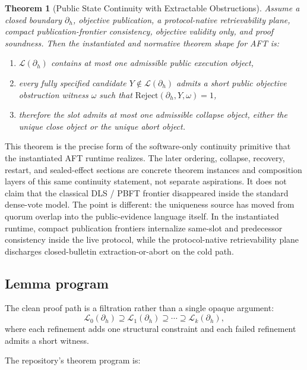 \documentclass[11pt]{article}
\newtheorem{theorem}{Theorem}
\newcommand{\AFT}{\textsc{AFT}}
\begin{document}
\begin{theorem}[Public State Continuity with Extractable Obstructions]
Assume a closed boundary \(\partial_h\), objective publication, a
protocol-native retrievability plane, compact publication-frontier consistency,
objective validity only, and proof soundness. Then the instantiated and
normative theorem shape
for \AFT{} is:
\begin{enumerate}[leftmargin=1.5em]
\item \(\mathcal{L}(\partial_h)\) contains at most one admissible public
execution object,
\item every fully specified candidate \(Y \notin \mathcal{L}(\partial_h)\)
admits a short public objective obstruction witness \(\omega\) such that
\(\mathrm{Reject}(\partial_h, Y, \omega)=1\),
\item therefore the slot admits at most one admissible collapse object, either
the unique close object or the unique abort object.
\end{enumerate}
\end{theorem}

This theorem is the precise form of the software-only continuity primitive that
the instantiated \AFT{} runtime realizes. The later ordering, collapse,
recovery, restart, and sealed-effect sections are concrete theorem instances
and composition layers of this same continuity statement, not separate
aspirations. It does not claim that the classical DLS / PBFT frontier
disappeared inside the standard dense-vote model. The point is different: the
uniqueness source has moved from quorum overlap into the public-evidence
language itself.
In the instantiated runtime, compact publication frontiers internalize same-slot and
predecessor consistency inside the live protocol, while the protocol-native
retrievability plane discharges closed-bulletin extraction-or-abort on the
cold path.

\subsection{Lemma program}

The clean proof path is a filtration rather than a single opaque argument:
\[
\mathcal{L}_0(\partial_h) \supseteq \mathcal{L}_1(\partial_h) \supseteq \cdots
\supseteq \mathcal{L}_k(\partial_h),
\]
where each refinement adds one structural constraint and each failed refinement
admits a short witness.

The repository's theorem program is:
\end{document}
